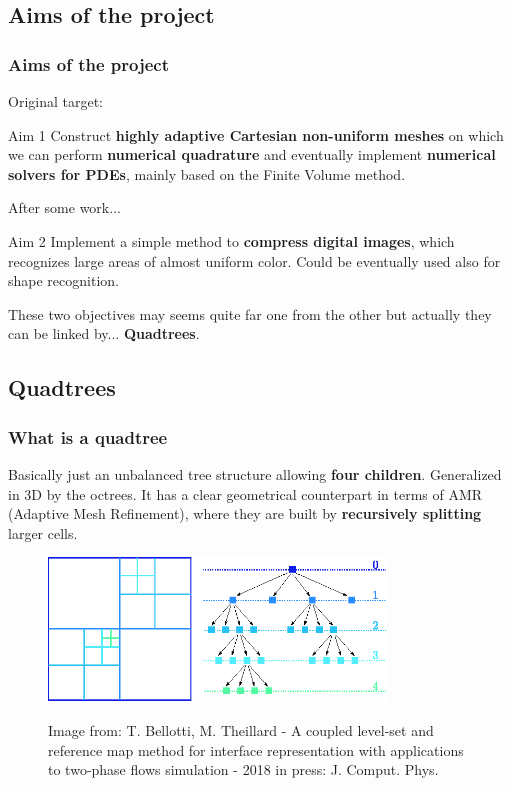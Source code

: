 \documentclass[8pt]{beamer}
\begin{document}
\subsection{Aims of the project}
\begin{frame}
\frametitle{Aims of the project}
\pause
Original target:
\begin{block}{Aim 1}
 Construct \textbf{highly adaptive Cartesian non-uniform meshes} on which we can perform \textbf{numerical quadrature} and eventually implement \textbf{numerical solvers for PDEs}, mainly based on the Finite Volume method.
\end{block}
\pause
After some work...
\begin{block}{Aim 2}
Implement a simple method to \textbf{compress digital images}, which recognizes large areas of almost uniform color. Could be eventually used also for shape recognition. 
\end{block}
\pause

These two objectives may seems quite far one from the other but actually they can be linked by... \textbf{Quadtrees}.

\end{frame}
\begin{frame}

\subsection{Quadtrees}
\frametitle{What is a quadtree}
\pause
Basically just an unbalanced tree structure allowing \textbf{four children}. Generalized in 3D by the octrees.
 \pause
 It has a clear geometrical counterpart in terms of AMR (Adaptive Mesh Refinement), where they are built by \textbf{recursively splitting} larger cells.
\begin{figure}[!h]
\begin{center}
\includegraphics[width=0.8\textwidth]{./figures/quadtree.eps}

\begin{tiny}
Image from: T. Bellotti, M. Theillard - A coupled level-set and reference map method for interface representation with applications to two-phase flows simulation - 2018 in press: J. Comput. Phys.
\end{tiny}
\end{center}
\end{figure}
\end{frame}
\end{document}
